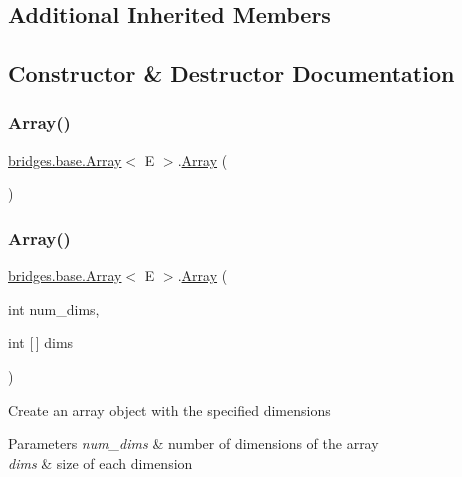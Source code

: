 \subsection*{Additional Inherited Members}


\subsection{Constructor \& Destructor Documentation}
\mbox{\label{classbridges_1_1base_1_1_array_ad5dbf7bbd9811c2dac16a5c135465d4b}} 
\subsubsection{\texorpdfstring{Array()}{Array()}\hspace{0.1cm}{\footnotesize\ttfamily [1/2]}}
{\footnotesize\ttfamily \mbox{\hyperlink{classbridges_1_1base_1_1_array}{bridges.\+base.\+Array}}$<$ E $>$.\mbox{\hyperlink{classbridges_1_1base_1_1_array}{Array}} (\begin{DoxyParamCaption}{ }\end{DoxyParamCaption})}

\mbox{\label{classbridges_1_1base_1_1_array_ab37dbe6efe0c34242456971e430763f7}} 
\subsubsection{\texorpdfstring{Array()}{Array()}\hspace{0.1cm}{\footnotesize\ttfamily [2/2]}}
{\footnotesize\ttfamily \mbox{\hyperlink{classbridges_1_1base_1_1_array}{bridges.\+base.\+Array}}$<$ E $>$.\mbox{\hyperlink{classbridges_1_1base_1_1_array}{Array}} (\begin{DoxyParamCaption}\item[{int}]{num\+\_\+dims,  }\item[{int \mbox{[}$\,$\mbox{]}}]{dims }\end{DoxyParamCaption})}

Create an array object with the specified dimensions


\begin{DoxyParams}{Parameters}
{\em num\+\_\+dims} & number of dimensions of the array \\
\hline
{\em dims} & size of each dimension \\
\hline
\end{DoxyParams}


